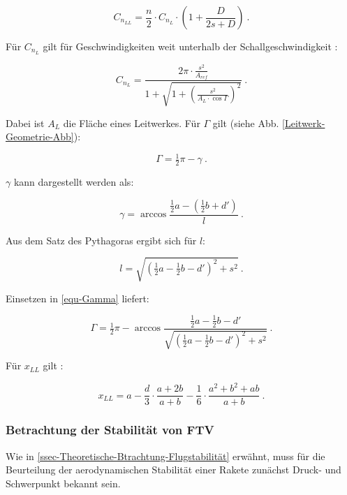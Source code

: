 \documentclass[10pt,a4paper]{article}
\begin{document}
\begin{equation}
C_{n_{LL}} = \frac{n}{2} \cdot C_{n_{L}} \cdot \left(1+\frac{D}{2s + D}\right) \ .
\end{equation}

\noindent
Für $C_{n_{L}}$ gilt für Geschwindigkeiten weit unterhalb der Schallgeschwindigkeit \cite{sn}:

\begin{equation}
C_{n_{L}} = \dfrac{2\pi \cdot \frac{s^{2}}{A_{ref}}} {1+ \sqrt{1+ \left(\frac{s^{2}}{A_{L} \cdot \cos \Gamma}\right) ^{2} }} \ .
\end{equation}

\noindent
Dabei ist ${A_{L}}$ die Fläche eines Leitwerkes. 
Für $\Gamma$ gilt (siehe Abb. \ref{Leitwerk-Geometrie-Abb}):

\begin{equation}
\Gamma = \tfrac{1}{2} \pi - \gamma \ .
\label{equ-Gamma}
\end{equation}

\noindent
$\gamma$ kann dargestellt werden als:

\[ \gamma = \arccos \frac{\tfrac{1}{2}a - \left(\tfrac{1}{2}b + d'\right) }{l} \ .\]

\noindent
Aus dem Satz des Pythagoras ergibt sich für $l$:

\[ l = \sqrt{\left(\tfrac{1}{2}a-\tfrac{1}{2}b-d'\right) ^{2}+s^{2}} \ .\]

\noindent
Einsetzen in \eqref{equ-Gamma} liefert:

\begin{equation}
\Gamma = \tfrac{1}{2}\pi - \arccos \dfrac{\tfrac{1}{2}a - \tfrac{1}{2}b - d' }   {\sqrt{\left(\tfrac{1}{2}a-\tfrac{1}{2}b-d'\right) ^{2}+s^{2}}} \ .
\label{equ-Gamma-Vollständig}
\end{equation}

\noindent
Für $x_{LL}$ gilt \cite{sn}:

\begin{equation}
x_{LL} = a - \frac{d}{3} \cdot \frac{a+2b}{a+b} - \frac{1}{6} \cdot \frac{a^{2}+b^{2}+ab} {a+b} \ .
\end{equation}


\subsubsection{Betrachtung der Stabilität von FTV}

Wie in \ref{ssec-Theoretische-Btrachtung-Flugstabilität} erwähnt, muss für die Beurteilung der aerodynamischen Stabilität einer Rakete zunächst Druck- und Schwerpunkt bekannt sein.
\end{document}
